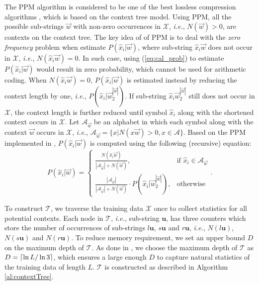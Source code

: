The PPM algorithm is considered to be one of the best lossless compression algorithms \cite{begleiter2004prediction}, which is based on the context tree model.
Using PPM, all the possible sub-strings $\vec{w}$ with non-zero occurrences in $\mathcal{X}$, \textit{i.e.}, $N(\vec{w}) > 0$, are contexts on the context tree. 
The key idea of of PPM is to deal with the \textit{zero frequency} problem when estimate $P(\hat{x}_i|\vec{w})$, where sub-string $\hat{x}_i\vec{w}$ does not occur in $\mathcal{X}$, \textit{i.e.}, $N(\hat{x}_i\vec{w})=0$.
In such case, using (\ref{eq:cal_prob}) to estimate $P(\hat{x}_i|\vec{w})$ would result in zero probability, which cannot be used for arithmetic coding.
When $N(\hat{x}_i\vec{w})=0$, $P(\hat{x}_i|\vec{w})$ is estimated instead by reducing the context length by one, \textit{i.e.}, $P(\hat{x}_i|\vec{w}_2^{|\vec{w}|})$.
If sub-string $\hat{x}_i \vec{w}_2^{|\vec{w}|}$ still does not occur in $\mathcal{X}$, the context length is further reduced until symbol $\hat{x}_i$ along with the shortened context occurs in $\mathcal{X}$. 
Let $\mathcal{A}_{\vec{w}}$ be an alphabet in which each symbol along with the context $\vec{w}$ occurs in $\mathcal{X}$, \textit{i.e.}, $\mathcal{A}_{\vec{w}}=\{x|N(x\vec{w}) > 0, x \in \mathcal{A}\}$.
Based on the PPM implemented in \cite{moffat1990implementing}, $P(\hat{x}_i|\vec{w})$ is computed using the following (recursive) equation:
\begin{equation}
P(\hat{x}_i|\vec{w}) = 
\begin{cases}
\frac{N(\hat{x}_i \vec{w})}{|\mathcal{A}_{\vec{w}}| + N(\vec{w})},&\text{if } \hat{x}_i \in \mathcal{A}_{\vec{w}} \\
\frac{|\mathcal{A}_{\vec{w}}|}{|\mathcal{A}_\vec{w}| + N(\vec{w})} \cdot P(\hat{x}_i|\vec{w}_2^{|\vec{w}|}),&\text{otherwise}
\end{cases}.
\label{eq:ppm_prob}
\end{equation}

To construct $\mathcal{T}$, we traverse the training data $\mathcal{X}$ once to collect statistics for all potential contexts.
Each node in $\mathcal{T}$, \textit{i.e.}, sub-string $\mathbf{u}$, has three counters which store the number of occurrences of sub-strings $l\mathbf{u}$, $s\mathbf{u}$ and $r\mathbf{u}$, \textit{i.e.}, $N(l\mathbf{u})$, $N(s\mathbf{u})$ and $N(r\mathbf{u})$.
To reduce memory requirement, we set an upper bound $D$ on the maximum depth of $\mathcal{T}$.
As done in \cite{rissanen1983universal}, we choose the maximum depth of $\mathcal{T}$ as $D=\lceil\ln{L}/\ln{3}\rceil$, which ensures a large enough $D$ to capture natural statistics of the training data of length $L$.
$\mathcal{T}$ is constructed as described in Algorithm \ref{al:contextTree}.



